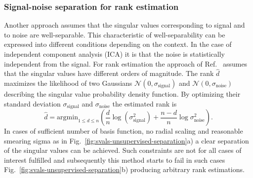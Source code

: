 \subsubsection{Signal-noise separation for rank estimation}
Another approach assumes that the singular values corresponding to signal and to noise are well-separable.
This characteristic of well-separability can be expressed into different conditions depending on the context.
In the case of independent component analysis (ICA) it is that the noise is statistically independent from the signal. 
For rank estimation the approach of Ref.~\cite{JMLR:v9:braun08a} assumes that the singular values have different orders of magnitude.
The rank $\hat{d}$ maximizes the likelihood of two Gaussians $\mathcal{N}(0, \sigma_\textrm{signal})$ and $\mathcal{N}(0, \sigma_\textrm{noise})$ describing the singular value probability density function.
By optimizing their standard deviation $\sigma_\textrm{signal}$ and $\sigma_\textrm{noise}$ the estimated rank is
\begin{equation}
    \hat{d} = \textrm{argmin}_{1\leq d\leq n} (\frac{d}{n}\log(\sigma_\textrm{signal}^2) + \frac{n-d}{n} \log\sigma_\textrm{noise}^2 ).
\end{equation}
In cases of sufficient number of basis function, no radial scaling and reasonable smearing sigma as in Fig.~\ref{fig:svals-unsupervised-separation}a) a clear separation of the singular values can be achieved.
Such constraints are not for all cases of interest fulfilled and subsequently this method starts to fail in such cases Fig.~\ref{fig:svals-unsupervised-separation}b) producing arbitrary rank estimations.
